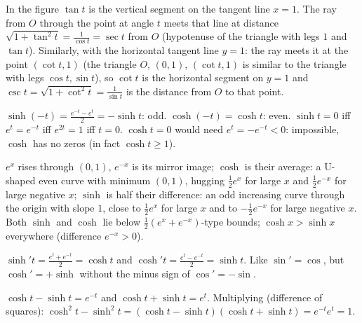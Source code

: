  In the figure $\tan t$ is the vertical segment on the tangent line $x=1$. The ray from $O$ through the point at angle $t$ meets that line at distance $\sqrt{1+\tan^2t}=\frac1{\cos t}=\sec t$ from $O$ (hypotenuse of the triangle with legs $1$ and $\tan t$). Similarly, with the horizontal tangent line $y=1$: the ray meets it at the point $(\cot t,1)$ (the triangle $O$, $(0,1)$, $(\cot t,1)$ is similar to the triangle with legs $\cos t,\sin t$), so $\cot t$ is the horizontal segment on $y=1$ and $\csc t=\sqrt{1+\cot^2t}=\frac1{\sin t}$ is the distance from $O$ to that point.

 $\sinh(-t)=\frac{e^{-t}-e^t}2=-\sinh t$: odd. $\cosh(-t)=\cosh t$: even. $\sinh t=0$ iff $e^t=e^{-t}$ iff $e^{2t}=1$ iff $t=0$. $\cosh t=0$ would need $e^t=-e^{-t}<0$: impossible, $\cosh$ has no zeros (in fact $\cosh t\ge1$).

 $e^x$ rises through $(0,1)$, $e^{-x}$ is its mirror image; $\cosh$ is their average: a U-shaped even curve with minimum $(0,1)$, hugging $\frac12e^{x}$ for large $x$ and $\frac12e^{-x}$ for large negative $x$; $\sinh$ is half their difference: an odd increasing curve through the origin with slope $1$, close to $\frac12e^x$ for large $x$ and to $-\frac12e^{-x}$ for large negative $x$. Both $\sinh$ and $\cosh$ lie below $\frac12(e^x+e^{-x})$-type bounds; $\cosh x>\sinh x$ everywhere (difference $e^{-x}>0$).

 $\sinh't=\frac{e^t+e^{-t}}2=\cosh t$ and $\cosh't=\frac{e^t-e^{-t}}2=\sinh t$. Like $\sin'=\cos$, but $\cosh'=+\sinh$ without the minus sign of $\cos'=-\sin$.

 $\cosh t-\sinh t=e^{-t}$ and $\cosh t+\sinh t=e^t$. Multiplying (difference of squares): $\cosh^2t-\sinh^2t=(\cosh t-\sinh t)(\cosh t+\sinh t)=e^{-t}e^t=1$.
